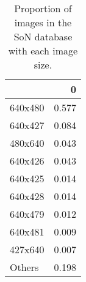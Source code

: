 \begin{table}
\caption{Proportion of images in the SoN database with each image size.}
\label{tab:SoNImageSizes}
\begin{tabular}{lr}
\toprule
 & 0 \\
\midrule
640x480 & 0.577 \\
640x427 & 0.084 \\
480x640 & 0.043 \\
640x426 & 0.043 \\
640x425 & 0.014 \\
640x428 & 0.014 \\
640x479 & 0.012 \\
640x481 & 0.009 \\
427x640 & 0.007 \\
Others & 0.198 \\
\bottomrule
\end{tabular}
\end{table}
